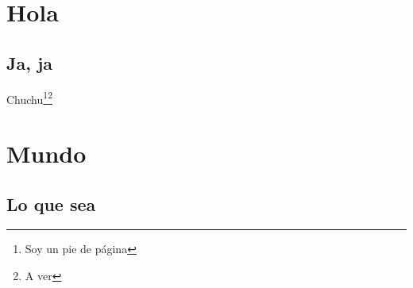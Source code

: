 \documentclass[12pt,a4paper,openany]{memoir}
\begin{document}
\clearpage

{
    \renewcommand\cleardoublepage\newpage
    \frontmatter
}

\tableofcontents*

{
    \renewcommand\cleardoublepage\newpage
    \mainmatter
}

\chapter{Hola}

\noindent \lipsum[1-6]

\section{Ja, ja}

\noindent Chuchu\footnote{Soy un pie de página}\footnote{A ver} \lipsum[7-12]

\chapter{Mundo}

\noindent \kant[1-4]

\section{Lo que sea}

\noindent \kant[5-7]
\end{document}
